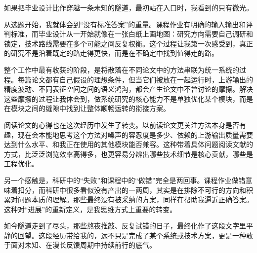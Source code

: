 
\begin{designsummary}

如果把毕业设计比作穿越一条未知的隧道，最初站在入口时，我看到的只有微光。

从选题开始，我就体会到“没有标准答案”的重量。课程作业有明确的输入输出和评判标准，而毕业设计从一开始就像在一张白纸上画地图：研究方向需要自己调研和锁定，技术路线需要在多个可能之间反复权衡。这个过程让我第一次感受到，真正的研究不是沿着既定的路走得更快，而是在不确定中找到值得走的路。

整个工作中最有收获的阶段，是将散落在不同论文中的方法串联为统一系统的过程。每篇论文都有自己假设的理想条件，但当它们被放在一起运行时，上游输出的精度波动、不同表征空间之间的语义鸿沟，都会产生论文中不曾讨论的摩擦。解决这些摩擦的过程让我体会到，做系统研究的核心能力不是单独优化某个模块，而是在模块之间的缝隙中找到让整体顺畅运转的衔接方案。

阅读论文的心得也在这次经历中发生了转变。以前读论文更关注方法本身是否有趣，现在会本能地思考这个方法对噪声的容忍度是多少、依赖的上游输出质量需要达到什么水平、和我正在使用的其他模块能否兼容。这种带着具体问题阅读文献的方式，比泛泛浏览效率高得多，也更容易分辨出哪些技术细节是核心贡献，哪些是工程优化。

另一个感触是，科研中的“失败”和课程中的“做错”完全是两回事。课程作业做错意味着扣分，而科研中很多看似没有产出的一两周，其实是在排除不可行的方向和积累对问题本质的理解。那些最终没有被采纳的方案，同样在帮助我逼近正确答案。这种对“进展”的重新定义，是我思维方式上重要的转变。

如今隧道走到了尽头，那些熬夜推敲、反复试错的日子，最终化作了这段文字里平静的回望。这段经历带给我的，远不只是完成了某个系统或技术方案，更是一种敢于面对未知、在漫长反馈周期中持续前行的底气。

\end{designsummary}

